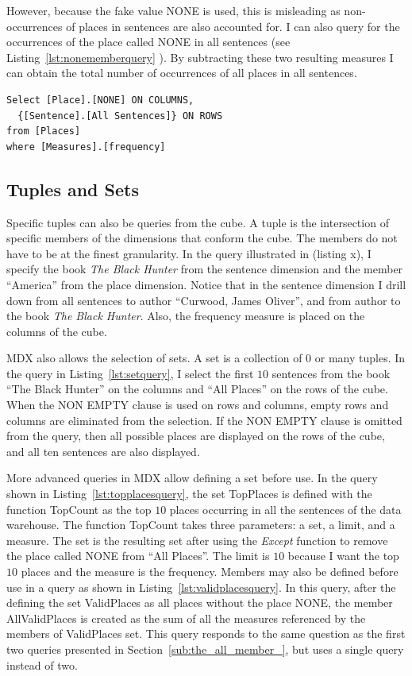 However, because the fake value NONE is used, this is misleading as non-occurrences of places in sentences are also accounted for. I can also query
for the occurrences of the place called NONE in all sentences (see Listing~\ref{lst:nonememberquery} ). By subtracting these two resulting measures I can
obtain the total number of occurrences of all places in all sentences.

\begin{lstlisting}[label=lst:nonememberquery,caption=MDX query for all occurrences of NONE]
Select [Place].[NONE] ON COLUMNS,
  {[Sentence].[All Sentences]} ON ROWS
from [Places]
where [Measures].[frequency]
\end{lstlisting}


\subsection{Tuples and Sets} %
\label{sub:tuples_and_sets}

Specific tuples can also be queries from the cube. A tuple is the intersection of specific members of the dimensions that conform the cube. The members do not
have to be at the finest granularity. In the query illustrated in (listing x), I specify the book \emph{The Black Hunter} from the sentence dimension and the
member ``America'' from the place dimension. Notice that in the sentence dimension I drill down from all sentences to author ``Curwood, James Oliver'', and
from author to the book \emph{The Black Hunter}. Also, the frequency measure is placed on the columns of the cube.

MDX also allows the selection of sets. A set is a collection of 0 or many tuples. In the query in Listing~\ref{lst:setquery}, I select the first $10$ sentences
from the book ``The Black Hunter'' on the columns and ``All Places'' on the rows of the cube. When the NON EMPTY clause is used on rows and columns, empty rows
and columns are eliminated from the selection. If the NON EMPTY clause is omitted from the query, then all possible places are displayed on the rows of the
cube, and all ten sentences are also displayed.

More advanced queries in MDX allow defining a set before use. In the query shown in Listing~\ref{lst:topplacesquery}, the set TopPlaces is defined with the
function TopCount as the top $10$ places occurring in all the sentences of the data warehouse. The function TopCount takes three parameters: a set, a limit,
and a measure. The set is the resulting set after using the \emph{Except} function to remove the place called NONE from ``All Places''. The limit is $10$
because I want the top $10$ places and the measure is the frequency. Members may also be defined before use in a query as shown in
Listing~\ref{lst:validplacesquery}. In this query, after the defining the set ValidPlaces as all places without the place NONE, the member AllValidPlaces is
created as the sum of all the measures referenced by the members of ValidPlaces set. This query responds to the same question as the first two queries
presented in Section~\ref{sub:the_all_member_}, but uses a single query instead of two.


